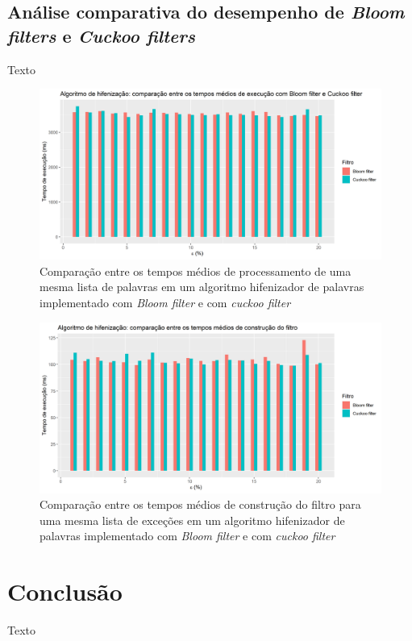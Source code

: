 \documentclass[12pt,twoside,english,brazilian]{book}
\begin{document}
\section{Análise comparativa do desempenho de \textit{Bloom filters} e \textit{Cuckoo filters}}

Texto

\begin{figure}
    \begin{center}
        \includegraphics[width=0.9\linewidth]{img/cuckoo-bloom-comparison.png}
        \caption{\label{cuckoo-bloom-comparison} Comparação entre os tempos médios de processamento de uma mesma lista de palavras em um algoritmo hifenizador de palavras implementado com \textit{Bloom filter} e com \textit{cuckoo filter}}
    \end{center}
\end{figure}

\begin{figure}
    \begin{center}
        \includegraphics[width=0.9\linewidth]{img/build-cuckoo-bloom-comparison.png}
        \caption{\label{build-cuckoo-bloom-comparison} Comparação entre os tempos médios de construção do filtro para uma mesma lista de exceções em um algoritmo hifenizador de palavras implementado com \textit{Bloom filter} e com \textit{cuckoo filter}}
    \end{center}
\end{figure}

\clearpage

\chapter{Conclusão}

Texto

\clearpage

\nocite{*}
\printbibliography[
  title=\refname\label{bibliografia}, %
]
\end{document}
